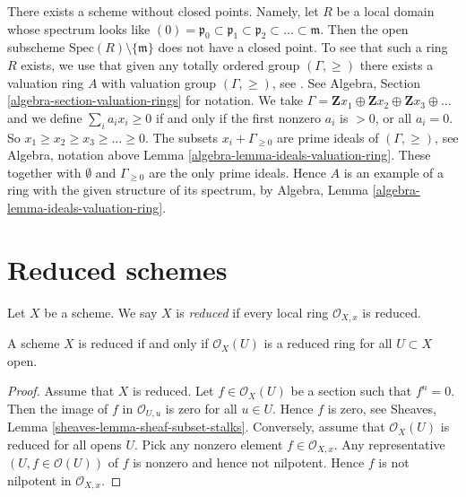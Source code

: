 \begin{example}
\label{example-scheme-without-closed-points}
There exists a scheme without closed points.
Namely, let $R$ be a local domain whose spectrum
looks like
$(0) = \mathfrak p_0 \subset \mathfrak p_1 \subset \mathfrak p_2
\subset \ldots \subset \mathfrak m$. Then the open subscheme
$\text{Spec}(R) \setminus \{\mathfrak m\}$ does not have
a closed point. To see that such a ring $R$ exists, we use
that given any totally ordered group $(\Gamma, \geq)$
there exists a valuation ring $A$ with valuation group $(\Gamma, \geq)$,
see \cite{Krull}. See Algebra, Section \ref{algebra-section-valuation-rings}
for notation. We take
$\Gamma = \mathbf{Z}x_1 \oplus \mathbf{Z}x_2 \oplus \mathbf{Z}x_3 \oplus
\ldots$ and we define $\sum_i a_i x_i \geq 0$ if and only
if the first nonzero $a_i$ is $> 0$, or all $a_i = 0$.
So $x_1 \geq x_2 \geq x_3 \geq  \ldots \geq 0$.
The subsets $x_i + \Gamma_{\geq 0}$ are prime ideals
of $(\Gamma, \geq)$, see Algebra, notation above
Lemma \ref{algebra-lemma-ideals-valuation-ring}. These together
with $\emptyset$ and $\Gamma_{\geq 0}$ are the only prime ideals.
Hence $A$ is an example of a ring with the given structure of
its spectrum, by
Algebra, Lemma \ref{algebra-lemma-ideals-valuation-ring}.
\end{example}



















\section{Reduced schemes}
\label{section-reduced}

\begin{definition}
\label{definition-reduced}
Let $X$ be a scheme. We say $X$ is {\it reduced} if every local ring
$\mathcal{O}_{X, x}$ is reduced.
\end{definition}

\begin{lemma}
\label{lemma-reduced}
A scheme $X$ is reduced if and only if $\mathcal{O}_X(U)$
is a reduced ring for all $U \subset X$ open.
\end{lemma}

\begin{proof}
Assume that $X$ is reduced.
Let $f \in \mathcal{O}_X(U)$ be a section such that $f^n = 0$.
Then the image of $f$ in $\mathcal{O}_{U, u}$ is zero for
all $u \in U$. Hence $f$ is zero, see
Sheaves, Lemma \ref{sheaves-lemma-sheaf-subset-stalks}.
Conversely, assume that $\mathcal{O}_X(U)$ is reduced
for all opens $U$. Pick any nonzero element $f \in \mathcal{O}_{X, x}$.
Any representative $(U, f \in \mathcal{O}(U))$  of $f$ is nonzero and
hence not nilpotent. Hence $f$ is not nilpotent in $\mathcal{O}_{X, x}$.
\end{proof}

